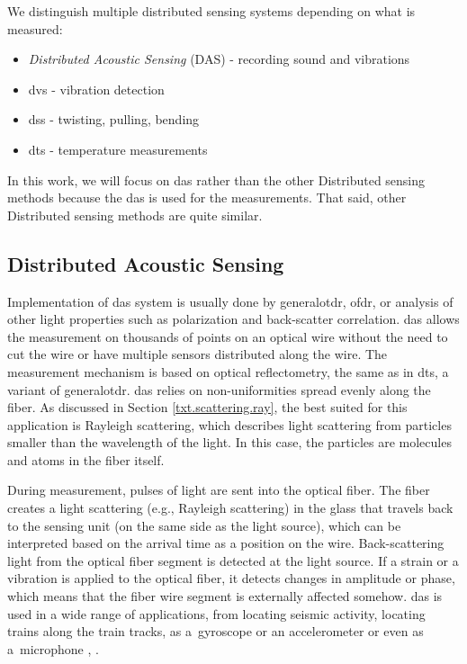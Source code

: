 We distinguish multiple distributed sensing systems depending on what is measured:
\begin{itemize}
    \item \emph{Distributed Acoustic Sensing} (DAS) - recording sound and vibrations
    \item \ac{dvs} - vibration detection
    \item \ac{dss} - twisting, pulling, bending
    \item \ac{dts} - temperature measurements
\end{itemize}

In this work, we will focus on \ac{das} rather than the other Distributed sensing methods because the \ac{das} is used for the measurements. That said, other Distributed sensing methods are quite similar.


\subsection{Distributed Acoustic Sensing}\label{txt.das}

Implementation of \ac{das} system is usually done by \ac{generalotdr}, \ac{ofdr}, or analysis of other light properties such as polarization and back-scatter correlation. \ac{das} allows the measurement on thousands of points on an optical wire without the need to cut the wire or have multiple sensors distributed along the wire. The measurement mechanism is based on optical reflectometry, the same as in \ac{dts}, a variant of \ac{generalotdr}. \ac{das} relies on non-uniformities spread evenly along the fiber. As discussed in Section \ref{txt.scattering.ray}, the best suited for this application is Rayleigh scattering, which describes light scattering from particles smaller than the wavelength of the light. In this case, the particles are molecules and atoms in the fiber itself.

During measurement, pulses of light are sent into the optical fiber. The fiber creates a light scattering (e.g., Rayleigh scattering) in the glass that travels back to the sensing unit (on the same side as the light source), which can be interpreted based on the arrival time as a position on the wire. Back-scattering light from the optical fiber segment is detected at the light source. If a strain or a vibration is applied to the optical fiber, it detects changes in amplitude or phase, which means that the fiber wire segment is externally affected somehow. \ac{das} is used in a wide range of applications, from locating seismic activity, locating trains along the train tracks, as a~gyroscope or an accelerometer or even as a~microphone \cite{WangYu2017RDVM}, \cite{kislov_das_newparadigm}.

